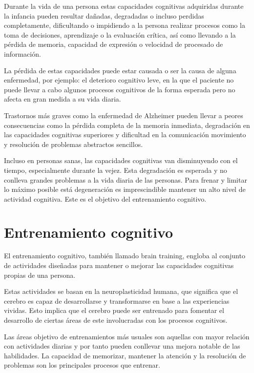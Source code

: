 Durante la vida de una persona estas capacidades cognitivas adquiridas durante la infancia pueden resultar dañadas, degradadas o incluso perdidas completamente, dificultando o impidiendo a la persona realizar procesos como la toma de decisiones, aprendizaje o la evaluación crítica, así como llevando a la pérdida de memoria, capacidad de expresión o velocidad de procesado de información. \cite{EA_cog_deterioro}

La pérdida de estas capacidades puede estar causada o ser la causa de alguna enfermedad, por ejemplo: el deterioro cognitivo leve, en la que el paciente no puede llevar a cabo algunos procesos cognitivos de la forma esperada pero no afecta en gran medida a su vida diaria.

Trastornos más graves como la enfermedad de Alzheimer pueden llevar a peores consecuencias como la pérdida completa de la memoria inmediata, degradación en las capacidades cognitivas superiores y dificultad en la comunicación movimiento y resolución de problemas abstractos sencillos. \cite{EA_cog_alzheimer}

Incluso en personas sanas, las capacidades cognitivas van disminuyendo con el tiempo, especialmente durante la vejez. Esta degradación es esperada y no conlleva grandes problemas a la vida diaria de las personas. Para frenar y limitar lo máximo posible está degeneración es imprescindible mantener un alto nivel de actividad cognitiva. Este es el objetivo del entrenamiento cognitivo.




\section{Entrenamiento cognitivo}

El entrenamiento cognitivo, también llamado brain training, engloba al conjunto de actividades diseñadas para mantener o mejorar las capacidades cognitivas propias de una persona.

Estas actividades se basan en la neuroplasticidad humana, que significa que el cerebro es capaz de desarrollarse y transformarse en base a las experiencias vividas. Esto implica que el cerebro puede ser entrenado para fomentar el desarrollo de ciertas áreas de este involucradas con los procesos cognitivos. \cite{EA_ent_plasticidad}

Las áreas objetivo de entrenamientos más usuales son aquellas con mayor relación con actividades diarias y por tanto pueden conllevar una mejora notable de las habilidades. La capacidad de memorizar, mantener la atención y la resolución de problemas son los principales procesos que entrenar.

